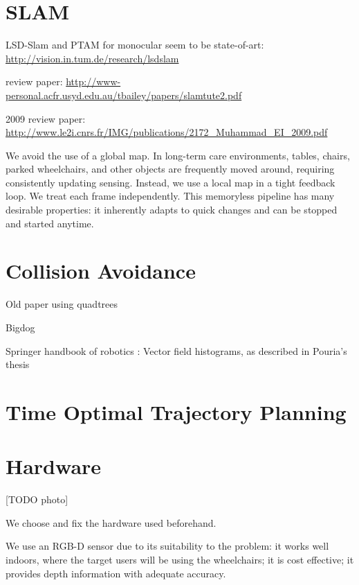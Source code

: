 \section{SLAM}

LSD-Slam and PTAM for monocular seem to be state-of-art: \url{http://vision.in.tum.de/research/lsdslam}

review paper: \url{http://www-personal.acfr.usyd.edu.au/tbailey/papers/slamtute2.pdf}

2009 review paper: \url{http://www.le2i.cnrs.fr/IMG/publications/2172_Muhammad_EI_2009.pdf}

We avoid the use of a global map. In long-term care environments, tables,
chairs, parked wheelchairs, and other objects are frequently moved around,
requiring consistently updating sensing. Instead, we use a local map in a tight
feedback loop. We treat each frame independently. This memoryless pipeline has
many desirable properties: it inherently adapts to quick changes and can be
stopped and started anytime.

\section{Collision Avoidance}
Old paper using quadtrees\cite{ghoshray1996comprehensive}

Bigdog \cite{raibert2008bigdog}

Springer handbook of robotics \cite{siciliano2008springer}: Vector field histograms, as described in Pouria's thesis \cite{talebifard2014risk}


\section{Time Optimal Trajectory Planning}
\cite{fiorini1996time}

\section{Hardware}

[TODO photo]

We choose and fix the hardware used beforehand.

We use an RGB-D sensor due to its suitability to the problem:
it works well indoors, where the target users will be using the wheelchairs; it
is cost effective; it provides depth information with adequate accuracy.

